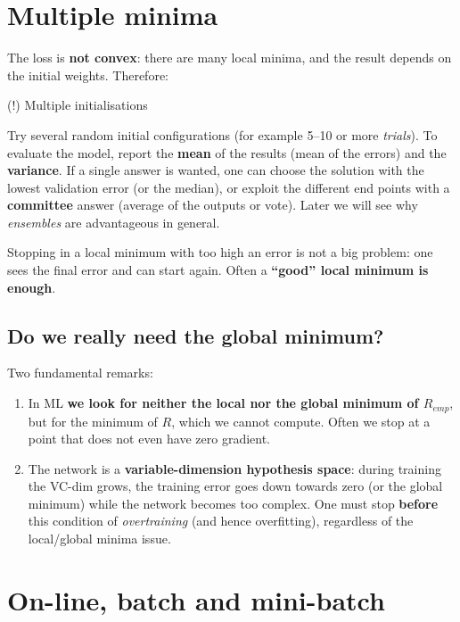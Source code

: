 \section{Multiple minima}\label{minimi-multipli}

The loss is \textbf{not convex}: there are many local minima, and the
result depends on the initial weights. Therefore:

\begin{boxtip}{(!) Multiple initialisations}

Try several random initial configurations (for example 5--10 or more
\emph{trials}). To evaluate the model, report the \textbf{mean} of the
results (mean of the errors) and the \textbf{variance}. If a single
answer is wanted, one can choose the solution with the lowest
validation error (or the median), or exploit the different end points
with a \textbf{committee} answer (average of the outputs or vote).
Later we will see why \emph{ensembles} are advantageous in general.

\end{boxtip}

Stopping in a local minimum with too high an error is not a big
problem: one sees the final error and can start again. Often a
\textbf{``good'' local minimum is enough}.

\subsection{Do we really need the global
minimum?}\label{serve-davvero-il-minimo-globale}

Two fundamental remarks:

\begin{enumerate}
\def\labelenumi{\arabic{enumi}.}
\tightlist
\item
  In ML \textbf{we look for neither the local nor the global minimum of
  \(R_{emp}\)}, but for the minimum of \(R\), which we cannot compute.
  Often we stop at a point that does not even have zero gradient.
\item
  The network is a \textbf{variable-dimension hypothesis space}: during
  training the VC-dim grows, the training error goes down towards zero
  (or the global minimum) while the network becomes too complex. One
  must stop \textbf{before} this condition of \emph{overtraining} (and
  hence overfitting), regardless of the local/global minima issue.
\end{enumerate}

\section{On-line, batch and mini-batch}\label{on-line-batch-e-mini-batch}

